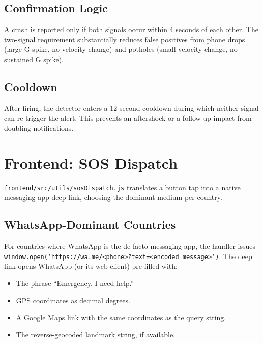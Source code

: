 \documentclass[11pt, a4paper]{article}
\newcommand{\file}[1]{\texttt{\small\color{rsblue}#1}}
\newcommand{\code}[1]{\texttt{\small#1}}
\begin{document}
\subsection{Confirmation Logic}

A crash is reported only if both signals occur within 4 seconds of each other. The two-signal requirement substantially reduces false positives from phone drops (large G spike, no velocity change) and potholes (small velocity change, no sustained G spike).

\subsection{Cooldown}

After firing, the detector enters a 12-second cooldown during which neither signal can re-trigger the alert. This prevents an aftershock or a follow-up impact from doubling notifications.

\section{Frontend: SOS Dispatch}

\file{frontend/src/utils/sosDispatch.js} translates a button tap into a native messaging app deep link, choosing the dominant medium per country.

\subsection{WhatsApp-Dominant Countries}

For countries where WhatsApp is the de-facto messaging app, the handler issues \code{window.open('https://wa.me/<phone>?text=<encoded message>')}. The deep link opens WhatsApp (or its web client) pre-filled with:

\begin{itemize}[leftmargin=*, itemsep=2pt, topsep=2pt]
  \item The phrase ``Emergency. I need help.''
  \item GPS coordinates as decimal degrees.
  \item A Google Maps link with the same coordinates as the query string.
  \item The reverse-geocoded landmark string, if available.
\end{itemize}
\end{document}
